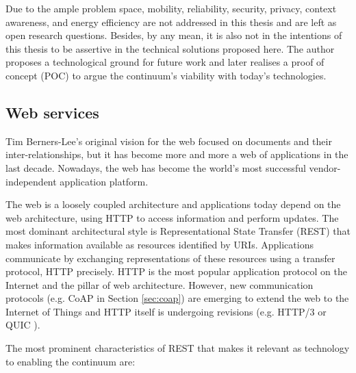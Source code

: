 \begin{enumerate}
\end{enumerate}

Due to the ample problem space, mobility, reliability, security, privacy, context awareness, and energy efficiency are not addressed in this thesis and are left as open research questions. Besides, by any mean, it is also not in the intentions of this thesis to be assertive in the technical solutions proposed here. The author proposes a technological ground for future work and later realises a proof of concept (POC) to argue the continuum's viability with today's technologies.

\subsection{Web services}
\label{sec:web}

Tim Berners-Lee's original vision for the web focused on documents and their inter-relationships, but it has become more and more a web of applications in the last decade. Nowadays, the web has become the world's most successful vendor-independent application platform.

The web is a loosely coupled architecture and applications today depend on the web architecture, using HTTP to access information and perform updates. The most dominant architectural style is Representational State Transfer (REST) \cite{rest} that makes information available as resources identified by URIs. Applications communicate by exchanging representations of these resources using a transfer protocol, HTTP precisely. HTTP is the most popular application protocol on the Internet and the pillar of web architecture. However, new communication protocols (e.g. CoAP in Section \ref{sec:coap}) are emerging to extend the web to the Internet of Things and HTTP itself is undergoing revisions (e.g. HTTP/3 or QUIC \cite{langley2017quic}).

The most prominent characteristics of REST that makes it relevant as technology to enabling the continuum are:

